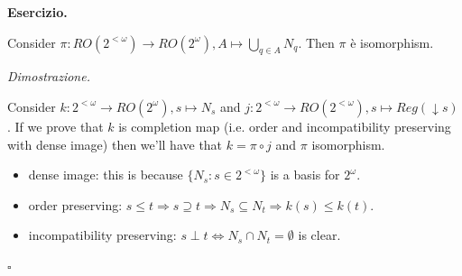 \documentclass[a4paper,12pt]{article}
\newenvironment{exercise}
  {\par\vspace{1em}\noindent\textbf{Esercizio.} }
  {\par\vspace{1em}}
\newenvironment{proof}
  {\par\vspace{0.5em}\noindent\textit{Dimostrazione.} }
  {\par\vspace{1em}\hfill$\square$}
\begin{document}
\begin{exercise}

	Consider $\pi : RO(2^{ < \omega}) \to RO(2^{\omega}), A \mapsto \bigcup_{q \in A} N_q$. Then $\pi$ è isomorphism.

\end{exercise}

\begin{proof}

	Consider $k: 2^{< \omega} \to RO(2^{\omega}), s \mapsto N_s$ and $j: 2^{< \omega} \to RO(2^{< \omega}), s \mapsto Reg(\downarrow s)$.
	If we prove that $k$ is completion map (i.e. order and incompatibility preserving with dense image) then we'll have that $k = \pi \circ j$ and $\pi$ isomorphism.
	\begin{itemize}
		\item	dense image: this is because $\{N_s : s \in 2^{< \omega}\}$ is a basis for $2^{\omega}$.
		\item	order preserving: $s \leq t \Rightarrow s \supseteq t \Rightarrow N_s \subseteq N_t \Rightarrow k(s) \leq k(t)$.
		\item	incompatibility preserving: $s \perp t \iff N_s \cap N_t = \emptyset$ is clear.
	\end{itemize}

\end{proof}
\end{document}
